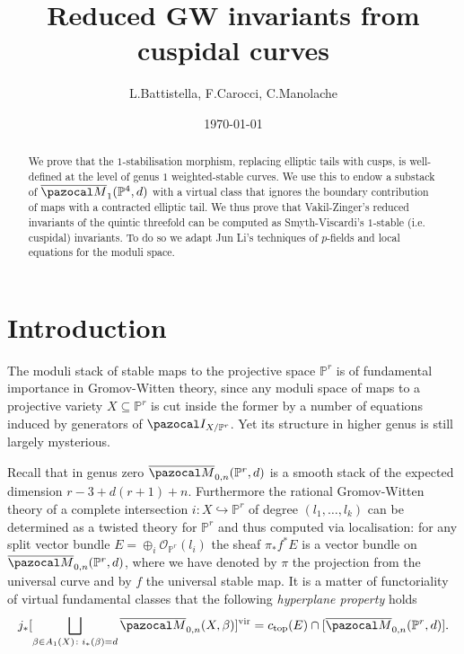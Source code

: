 \documentclass[11pt]{amsart}
\title{Reduced GW invariants from cuspidal curves}
\author{L.Battistella, F.Carocci, C.Manolache}
\date{\today}
\newcommand{\M}[4]{\overline{\pazocal M}_{#1,#2}(#3,#4)}
\newcommand{\PP}{\mathbb P}
\newcommand{\oM}{\overline{\pazocal M}}
\newcommand{\bcd}{\begin{center}\begin{tikzcd}}
\newcommand{\ecd}{\end{tikzcd}\end{center}}
\theoremstyle{plain}
\theoremstyle{definition}
\begin{document}
\begin{abstract}

We prove that the $1$-stabilisation morphism, replacing elliptic tails
with cusps, is well-defined at the level of genus $1$ weighted-stable
curves. We use this to endow a substack of $\oM_1(\PP^4,d)$ with a
virtual class that ignores the boundary contribution of maps with a
contracted elliptic tail. We thus prove that Vakil-Zinger's reduced
invariants of the quintic threefold can be computed as Smyth-Viscardi's
$1$-stable (i.e. cuspidal) invariants. To do so we adapt Jun Li's
techniques of $p$-fields and local equations for the moduli space.

\end{abstract}

\maketitle

\section*{Introduction}

The moduli stack of stable maps to the projective space $\PP^r$ is of fundamental importance in Gromov-Witten theory, since any moduli space of maps to a projective variety $X\subseteq \PP^r$ is cut inside the former by a number of equations induced by generators of $\pazocal I_{X/\PP^r}$. Yet its structure in higher genus is still largely mysterious.

Recall that in genus zero $\M{0}{n}{\PP^r}{d}$ is a smooth stack of the expected dimension $r-3+d(r+1)+n$. Furthermore the rational Gromov-Witten theory of a complete intersection $i\colon X\hookrightarrow \PP^r$ of degree $(l_1,\ldots,l_k)$ can be determined as a twisted theory for $\PP^r$ and thus computed via localisation: for any split vector bundle $E=\oplus_{i} \mathcal O_{\PP^r}(l_i)$ the sheaf $\pi_*f^*E$ is a vector bundle on $\M{0}{n}{\PP^r}{d}$, where we have denoted by $\pi$ the projection from the universal curve and by $f$ the universal stable map.
It is a matter of functoriality of virtual fundamental classes \cite{KON} \cite{CKL} \cite{KKP} that the following \emph{hyperplane property} holds
$$j_*[\bigsqcup_{\beta\in A_1(X)\colon i_*(\beta)=d}\M{0}{n}{X}{\beta}]^{\operatorname{vir}}=c_{\operatorname{top}}(E)\cap[\M{0}{n}{\PP^r}{d}].$$
\end{document}
